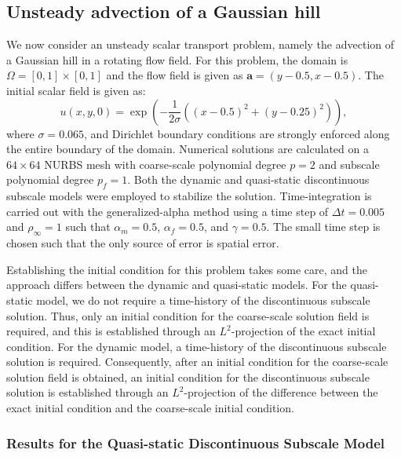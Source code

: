 \documentclass[11pt]{article}
\begin{document}
\subsection{Unsteady advection of a Gaussian hill}

We now consider an unsteady scalar transport problem, namely the advection of a Gaussian hill in a rotating flow field.  For this problem, the domain is $\Omega = [0, 1] \times [0, 1]$ and the flow field is given as $\bm{a} = \left( y- 0.5, x - 0.5 \right)$.  The initial scalar field is given as:
\begin{equation}\label{eq:gaussian_ic}
u\left(x,y,0\right) = \exp\left(-\frac{1}{2 \sigma} \left( \left(x - 0.5 \right)^2 + \left(y - 0.25 \right)^2 \right) \right),
\end{equation}
where $\sigma = 0.065$, and Dirichlet boundary conditions are strongly enforced along the entire boundary of the domain.  Numerical solutions are calculated on a $64 \times 64$ NURBS mesh with coarse-scale polynomial degree $p = 2$ and subscale polynomial degree $p_f = 1$.  Both the dynamic and quasi-static discontinuous subscale models were employed to stabilize the solution.  Time-integration is carried out with the generalized-alpha method using a time step of $\Delta t = 0.005$ and $\rho_{\infty} = 1$ such that $\alpha_m = 0.5$, $\alpha_f = 0.5$, and $\gamma = 0.5$.  The small time step is chosen such that the only source of error is spatial error.

Establishing the initial condition for this problem takes some care, and the approach differs between the dynamic and quasi-static models.  For the quasi-static model, we do not require a time-history of the discontinuous subscale solution.  Thus, only an initial condition for the coarse-scale solution field is required, and this is established through an $L^2$-projection of the exact initial condition.  For the dynamic model, a time-history of the discontinuous subscale solution is required.  Consequently, after an initial condition for the coarse-scale solution field is obtained, an initial condition for the discontinuous subscale solution is established through an $L^2$-projection of the difference between the exact initial condition and the coarse-scale initial condition.

\subsubsection{Results for the Quasi-static Discontinuous Subscale Model}
\end{document}
